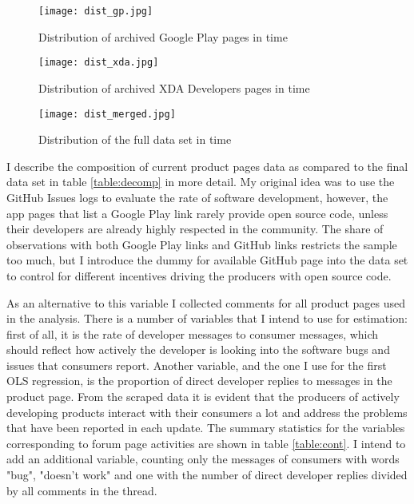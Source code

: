 \documentclass[13pt]{article}
\numberwithin{figure}{section}
\numberwithin{table}{section}
\theoremstyle{indented}
\numberwithin{equation}{section} %
\begin{document}


\begin{figure}
\centering
\begin{minipage}{.3\textwidth}
\centering
\texttt{[image: dist\_gp.jpg]}
\caption{Distribution of archived Google Play pages in time}
\label{fig:dist_gp}
\end{minipage}\hfill
\begin{minipage}{.3\textwidth}
\centering
\texttt{[image: dist\_xda.jpg]}
\caption{Distribution of archived XDA Developers pages in time}
\label{fig:dist_xda}
\end{minipage}\hfill
\begin{minipage}{.3\textwidth}
\centering
\texttt{[image: dist\_merged.jpg]}
\caption{Distribution of the full data set in time}
\label{fig:dist_merged}
\end{minipage}
\label{time_dist}
\end{figure}


I describe the composition of current product pages data as compared to the final data set in table \ref{table:decomp} in more detail. My original idea was to use the GitHub Issues logs to evaluate the rate of software development, however, the app pages that list a Google Play link rarely provide open source code, unless their developers are already highly respected in the community. The share of observations with both Google Play links and GitHub links restricts the sample too much, but I introduce the dummy for available GitHub page into the data set to control for different incentives driving the producers with open source code. 


As an alternative to this variable I collected comments for all product pages used in the analysis. There is a number of variables that I intend to use for estimation: first of all, it is the rate of developer messages to consumer messages, which should reflect how actively the developer is looking into the software bugs and issues that consumers report. Another variable, and the one I use for the first OLS regression, is the proportion of direct developer replies to messages in the product page. From the scraped data it is evident that the producers of actively developing products interact with their consumers a lot and address the problems that have been reported in each update. The summary statistics for the variables corresponding to forum page activities are shown in table \ref{table:cont}. I intend to add an additional variable, counting only the messages of consumers with words "bug", "doesn't work" and one with the number of direct developer replies divided by all comments in the thread. 
\end{document}
